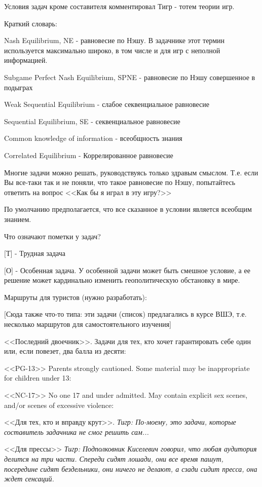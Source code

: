 Условия задач кроме составителя комментировал Тигр - тотем теории игр.\par


Краткий словарь:\par
Nash Equilibrium, NE - равновесие по Нэшу. В задачнике этот термин используется максимально широко, в том числе и для игр с неполной информацией.\par
Subgame Perfect Nash Equilibrium, SPNE - равновесие по Нэшу совершенное в подыграх\par
Weak Sequential Equilibrium - слабое секвенциальное равновесие \par
Sequential Equilibrium, SE - секвенциальное равновесие\par
Common knowledge of information - всеобщность знания\par
Correlated Equilibrium - Коррелированное равновесие\par

Многие задачи можно решать, руководствуясь только здравым смыслом. Т.е. если Вы все-таки так и не поняли, что такое равновесие по Нэшу, попытайтесь ответить на вопрос <<Как бы я играл в эту игру?>>\par
По умолчанию предполагается, что все сказанное в условии является всеобщим знанием.\par

Что означают пометки у задач?\par
$[$Т$]$ - Трудная задача\par
$[$О$]$ - Особенная задача. У особенной задачи может быть смешное условие, а ее решение может кардинально изменить геополитическую обстановку в мире.




Маршруты для туристов (нужно разработать):

$[$Сюда также что-то типа: эти задачи (список) предлагались в курсе ВШЭ, т.е. несколько маршрутов для самостоятельного изучения$]$

<<Последний двоечник>>. Задачи для тех, кто хочет гарантировать себе один или, если повезет, два балла из десяти:

<<PG-13>> Parents strongly cautioned. Some material may be inappropriate for children under 13:\par

<<NC-17>> No one 17 and under admitted. May contain explicit sex scenes, and/or scenes of excessive violence:\par

<<Для тех, кто и вправду крут>>. {\it Тигр:  По-моему, это задачи, которые составитель задачника не смог решить сам...} \par

<<Для прессы>> {\it Тигр: Подполковник Киселевич говорил, что любая аудитория делится на три части. Спереди сидят лошади, они все время  пашут, посередине сидят бездельники, они ничего не делают, а сзади сидит пресса, она ждет сенсаций.}\par



